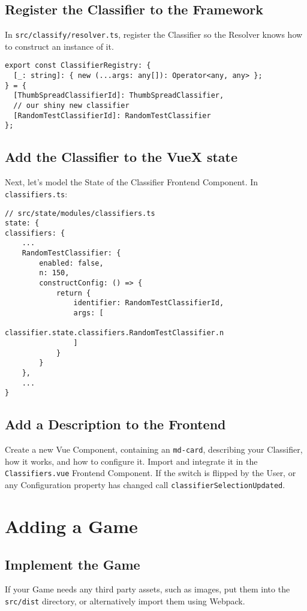 \subsection{Register the Classifier to the Framework}
In \texttt{src/classify/resolver.ts}, register the Classifier so the Resolver knows how to construct an instance of it.
\begin{verbatim}
export const ClassifierRegistry: {
  [_: string]: { new (...args: any[]): Operator<any, any> };
} = {
  [ThumbSpreadClassifierId]: ThumbSpreadClassifier,
  // our shiny new classifier
  [RandomTestClassifierId]: RandomTestClassifier
};
\end{verbatim}
\subsection{Add the Classifier to the VueX state}
Next, let's model the State of the Classifier Frontend Component. In \texttt{classifiers.ts}:

\begin{verbatim}
// src/state/modules/classifiers.ts
state: {
classifiers: {
    ...
    RandomTestClassifier: {
        enabled: false,
        n: 150,
        constructConfig: () => {
            return {
                identifier: RandomTestClassifierId,
                args: [
                    classifier.state.classifiers.RandomTestClassifier.n
                ]
            }
        }
    },
    ...
}
\end{verbatim}
\subsection{Add a Description to the Frontend}
Create a new Vue Component, containing an \texttt{md-card}, describing your Classifier, how it works, and how to configure it. Import and integrate it in the \texttt{Classifiers.vue} Frontend Component. If the switch is flipped by the User, or any Configuration property has changed call \texttt{classifierSelectionUpdated}.

\section{Adding a Game}
\subsection{Implement the Game}
If your Game needs any third party assets, such as images, put them into the \texttt{src/dist} directory, or alternatively import them using Webpack. 

